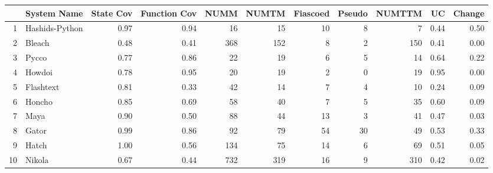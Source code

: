 \begin{table}[H]
\centering
\begingroup\small
\begin{tabular}{rlrrrrrrrrr}
  \hline
 & System Name & State Cov & Function Cov & NUMM & NUMTM & Fiascoed & Pseudo & NUMTTM & UC & Change \\
  \hline
1 & Hashids-Python & 0.97 & 0.94 &  16 &  15 &  10 &   8 &   7 & 0.44 & 0.50 \\
  2 & Bleach & 0.48 & 0.41 & 368 & 152 &   8 &   2 & 150 & 0.41 & 0.00 \\
  3 & Pycco & 0.77 & 0.86 &  22 &  19 &   6 &   5 &  14 & 0.64 & 0.22 \\
  4 & Howdoi & 0.78 & 0.95 &  20 &  19 &   2 &   0 &  19 & 0.95 & 0.00 \\
  5 & Flashtext & 0.81 & 0.33 &  42 &  14 &   7 &   4 &  10 & 0.24 & 0.09 \\
  6 & Honcho & 0.85 & 0.69 &  58 &  40 &   7 &   5 &  35 & 0.60 & 0.09 \\
  7 & Maya & 0.90 & 0.50 &  88 &  44 &  13 &   3 &  41 & 0.47 & 0.03 \\
  8 & Gator & 0.99 & 0.86 &  92 &  79 &  54 &  30 &  49 & 0.53 & 0.33 \\
  9 & Hatch & 1.00 & 0.56 & 134 &  75 &  14 &   6 &  69 & 0.51 & 0.05 \\
  10 & Nikola & 0.67 & 0.44 & 732 & 319 &  16 &   9 & 310 & 0.42 & 0.02 \\
   \hline
\end{tabular}
\endgroup
\end{table}
